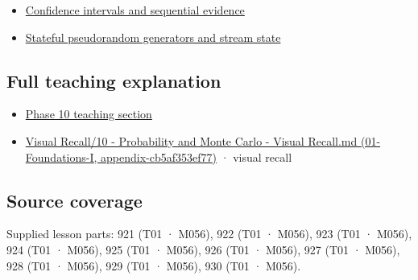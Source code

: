 \begin{itemize}
\tightlist
\item
  \hyperref[appendix-c83016554b1e]{Confidence intervals and sequential evidence}
\item
  \hyperref[appendix-e0f7c7e08f3a]{Stateful pseudorandom generators and stream state}
\end{itemize}

\subsection{Full teaching explanation}\label{appendix-a2360b435383-full-teaching-explanation}

\begin{itemize}
\tightlist
\item
  \hyperref[02-foundations-ii-ch023-discrete-and-continuous-distribution-families]{Phase 10 teaching section}
\item
  \href{../01-Foundations-I/main.pdf\#nameddest=appendix-cb5af353ef77}{Visual Recall/10 - Probability and Monte Carlo - Visual Recall.md (01-Foundations-I, appendix-cb5af353ef77)} · visual recall
\end{itemize}

\subsection{Source coverage}\label{appendix-a2360b435383-source-coverage}

Supplied lesson parts: 921 (T01 · M056), 922 (T01 · M056), 923 (T01 · M056), 924 (T01 · M056), 925 (T01 · M056), 926 (T01 · M056), 927 (T01 · M056), 928 (T01 · M056), 929 (T01 · M056), 930 (T01 · M056).
